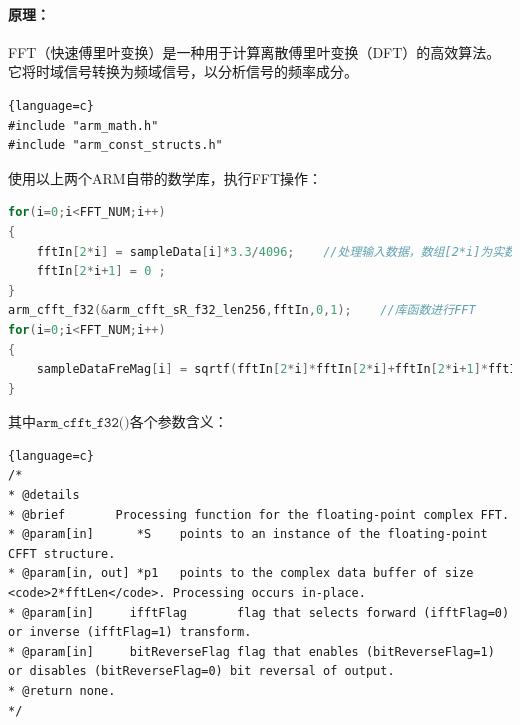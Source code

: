 \documentclass{article}
\begin{document}
\paragraph{原理：}
FFT（快速傅里叶变换）是一种用于计算离散傅里叶变换（DFT）的高效算法。它将时域信号转换为频域信号，以分析信号的频率成分。
\begin{lstlisting}{language=c}
#include "arm_math.h"
#include "arm_const_structs.h"
\end{lstlisting}
使用以上两个ARM自带的数学库，执行FFT操作：
\begin{lstlisting}[language=c]
for(i=0;i<FFT_NUM;i++)
{
    fftIn[2*i] = sampleData[i]*3.3/4096;    //处理输入数据，数组[2*i]为实数部分，数组[2*i+1]为虚数部分
    fftIn[2*i+1] = 0 ;
}
arm_cfft_f32(&arm_cfft_sR_f32_len256,fftIn,0,1);    //库函数进行FFT
for(i=0;i<FFT_NUM;i++)
{
    sampleDataFreMag[i] = sqrtf(fftIn[2*i]*fftIn[2*i]+fftIn[2*i+1]*fftIn[2*i+1])/FFT_NUM;   //将FFT结果转换为可读性的幅值结果
}
\end{lstlisting}
其中$\texttt{arm\_cfft\_f32()}$各个参数含义：
\begin{lstlisting}{language=c}
/*
* @details
* @brief       Processing function for the floating-point complex FFT.
* @param[in]      *S    points to an instance of the floating-point CFFT structure.
* @param[in, out] *p1   points to the complex data buffer of size <code>2*fftLen</code>. Processing occurs in-place.
* @param[in]     ifftFlag       flag that selects forward (ifftFlag=0) or inverse (ifftFlag=1) transform.
* @param[in]     bitReverseFlag flag that enables (bitReverseFlag=1) or disables (bitReverseFlag=0) bit reversal of output.
* @return none.
*/
\end{lstlisting}
\end{document}
